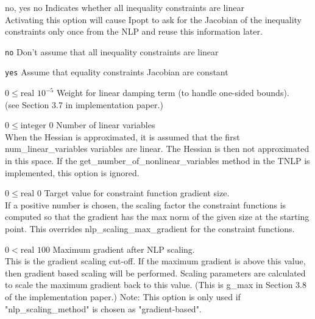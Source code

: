 %
{no, yes}%
{no}%
{Indicates whether all inequality constraints are linear\\
Activating this option will cause Ipopt to ask for the Jacobian of the inequality constraints only once from the NLP and reuse this information later.}%
{\begin{list}{}{
\setlength{\parsep}{0em}
\setlength{\leftmargin}{5ex}
\setlength{\labelwidth}{2ex}
\setlength{\itemindent}{0ex}
\setlength{\topsep}{0pt}}
\item[\texttt{no}] Don't assume that all inequality constraints are linear
\item[\texttt{yes}] Assume that equality constraints Jacobian are constant
\end{list}
}

%
{$0\leq\textrm{real}$}%
{$10^{- 5}$}%
{Weight for linear damping term (to handle one-sided bounds).\\
(see Section 3.7 in implementation paper.)}%
{}

%
{$0\leq\textrm{integer}$}%
{$0$}%
{Number of linear variables\\
When the Hessian is approximated, it is assumed that the first num\_linear\_variables variables are linear.  The Hessian is then not approximated in this space.  If the get\_number\_of\_nonlinear\_variables method in the TNLP is implemented, this option is ignored.}%
{}

%
{$0\leq\textrm{real}$}%
{$0$}%
{Target value for constraint function gradient size.\\
If a positive number is chosen, the scaling factor the constraint functions is computed so that the gradient has the max norm of the given size at the starting point.  This overrides nlp\_scaling\_max\_gradient for the constraint functions.}%
{}

%
{$0<\textrm{real}$}%
{$100$}%
{Maximum gradient after NLP scaling.\\
This is the gradient scaling cut-off. If the maximum gradient is above this value, then gradient based scaling will be performed. Scaling parameters are calculated to scale the maximum gradient back to this value. (This is g\_max in Section 3.8 of the implementation paper.) Note: This option is only used if "nlp\_scaling\_method" is chosen as "gradient-based".}%
{}

